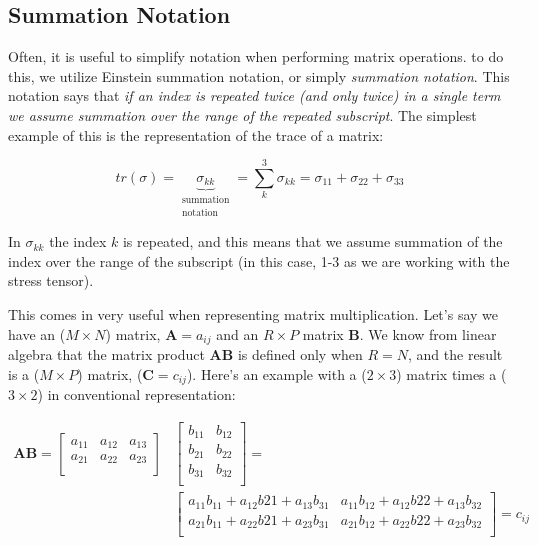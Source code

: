 \subsection{Summation Notation}

Often, it is useful to simplify notation when performing matrix operations. to do this, we utilize Einstein summation notation, or simply \emph{summation notation}. This notation says that \emph{if an index is repeated twice (and only twice) in a single term we assume summation over the range of the repeated subscript}. The simplest example of this is the representation of the trace of a matrix:

\[tr(\sigma) = \underbrace{\sigma_{kk}}_{\substack{\text{summation} \\ \text{notation}}} = \sum_{k}^{3}\sigma_{kk} = \sigma_{11}+\sigma_{22}+\sigma_{33}\]

In $\sigma_{kk}$ the index $k$ is repeated, and this means that we assume summation of the index over the range of the subscript (in this case, 1-3 as we are working with the stress tensor).

This comes in very useful when representing matrix multiplication. Let's say we have an ($M \times N$) matrix, $\mathbf{A} = a_{ij}$ and an $R \times P$ matrix $\mathbf{B}$. We know from linear algebra that the matrix product $\mathbf{AB}$ is defined only when $R = N$, and the result is a ($M \times P$) matrix, ($\mathbf{C} = c_{ij}$). Here's an example with a ($2 \times 3$) matrix times a ($3 \times 2$) in conventional representation:

\begin{align*}
\mathbf{AB} =
	\begin{bmatrix}
		a_{11} & a_{12} & a_{13}\\
		a_{21} & a_{22} & a_{23}\\
	\end{bmatrix}
	&\begin{bmatrix}
		b_{11} & b_{12}\\
		b_{21} & b_{22}\\
		b_{31} & b_{32}\\
	\end{bmatrix}
	= \\
	&\begin{bmatrix}
		a_{11}b_{11} + a_{12}b{21} + a_{13}b_{31} & a_{11}b_{12} + a_{12}b{22} + a_{13}b_{32}\\
		a_{21}b_{11} + a_{22}b{21} + a_{23}b_{31} & a_{21}b_{12} + a_{22}b{22} + a_{23}b_{32}\\
	\end{bmatrix}
	=c_{ij}
\end{align*}


